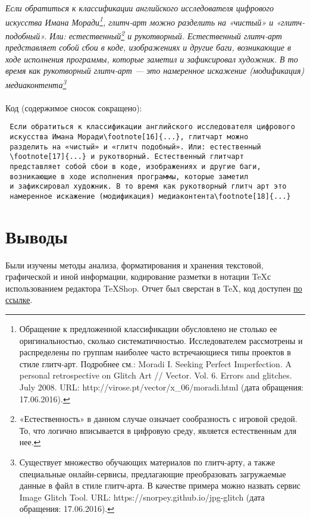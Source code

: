 \documentclass[a4paper]{article}
\begin{document}
\emph{Если обратиться к классификации английского исследователя цифрового искусства Имана Моради\footnote[16]{Обращение к предложенной классификации обусловлено не столько ее оригинальностью, сколько систематичностью. Исследователем рассмотрены и распределены по группам наиболее часто встречающиеся типы проектов в стиле глитч-арт. Подробнее см.: Moradi I. Seeking Perfect Imperfection. A personal retrospective on Glitch Art // Vector. Vol. 6. Errors and glitches. July 2008. URL: http://virose.pt/vector/x\_06/moradi.html (дата обращения: 17.06.2016).}, глитч-арт можно разделить на «чистый» и «глитч-подобный». Или: естественный\footnote[17]{«Естественность» в данном случае означает сообразность с игровой средой. То, что логично вписывается в цифровую среду, является естественным для нее.} и рукотворный. Естественный глитч-арт представляет собой сбои в коде, изображениях и другие баги, возникающие в ходе исполнения программы, которые заметил и зафиксировал художник. В то время как рукотворный глитч-арт — это намеренное искажение (модификация) медиаконтента\footnote[18]{Существует множество обучающих материалов по глитч-арту, а также специальные онлайн-сервисы, предлагающие преобразовать загружаемые данные в файл в стиле глитч-арта. В качестве примера можно назвать сервис Image Glitch Tool. URL: https://snorpey.github.io/jpg-glitch (дата обращения: 17.06.2016).} }\\\\
\hfill\break
Код (содержимое сносок сокращено):\\
\begin{lstlisting}
 Если обратиться к классификации английского исследователя цифрового 
 искусства Имана Моради\footnote[16]{...}, глитчарт можно 
 разделить на «чистый» и «глитч подобный». Или: естественный
 \footnote[17]{...} и рукотворный. Естественный глитчарт 
 представляет собой сбои в коде, изображениях и другие баги, 
 возникающие в ходе исполнения программы, которые заметил 
 и зафиксировал художник. В то время как рукотворный глитч арт это 
 намеренное искажение (модификация) медиаконтента\footnote[18]{...}
\end{lstlisting}
\thispagestyle{empty}
\newpage
\section{Выводы}
Были изучены методы анализа, форматирования и хранения текстовой, графической и иной информации, кодирование разметки в нотации \TeX с использованием редактора \TeX Shop. Отчет был сверстан в \TeX, код доступен \href{https://github.com/mammuthus/SUAI-Stuff/blob/main/LaTeX_LR1.tex}{по ссылке}.
\end{document}
